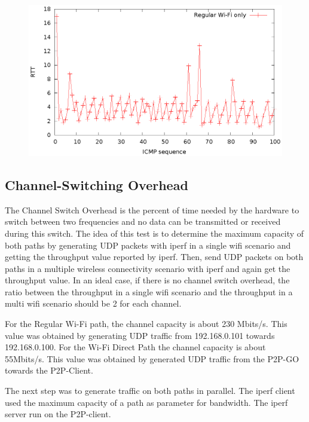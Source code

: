\begin{figure}[h!]
\includegraphics{src/img/regularwifionly.eps}
\label{img:regularwifionly}
\end{figure}

\subsection{Channel-Switching Overhead}
\label{sub-sec:chsw-overhead}

The Channel Switch Overhead is the percent of time needed by the hardware to switch between two frequencies and no data can be transmitted or received during this switch. The idea of this test is to determine the maximum capacity of both paths by generating UDP packets with iperf in a single wifi scenario and getting the throughput value reported by iperf. Then, send UDP packets on both paths in a multiple wireless connectivity scenario with iperf and again get the throughput value. In an ideal case, if there is no channel switch overhead, the ratio between the throughput in a single wifi scenario and the throughput in a multi wifi scenario should be 2 for each channel.

For the Regular Wi-Fi path, the channel capacity is  about 230 Mbits/s. This value was obtained by generating UDP traffic from 192.168.0.101 towards 192.168.0.100. For the Wi-Fi Direct Path the channel capacity is about 55Mbits/s. This value was obtained by generated UDP traffic from the P2P-GO towards the P2P-Client.

The next step was to generate traffic on both paths in parallel. The iperf client used the maximum capacity of a path as parameter for bandwidth. The iperf server run on the P2P-client.

